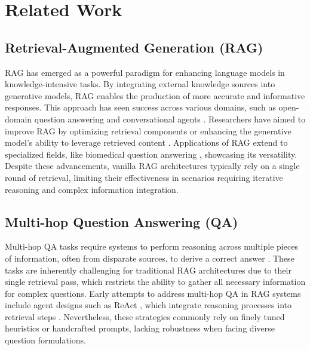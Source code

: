 \section{Related Work}

\subsection{Retrieval-Augmented Generation (RAG)}

RAG has emerged as a powerful paradigm for enhancing language models in knowledge-intensive tasks. By integrating external knowledge sources into generative models, RAG enables the production of more accurate and informative responses. This approach has seen success across various domains, such as open-domain question answering \citep{karpukhin2020dense} and conversational agents \citep{shuster2021retrieval}. Researchers have aimed to improve RAG by optimizing retrieval components \citep{zhang2023retrieve,nguyen2024reward,xu2024bmretriever} or enhancing the generative model’s ability to leverage retrieved content \citep{izacard2023atlas,zhang2024raft,fang2024enhancing,wei2024instructrag,jin2024rag,wang2024speculative,zhang2025rag}. Applications of RAG extend to specialized fields, like biomedical question answering \citep{xiong2024benchmarking,xu2024simrag,kim2024mdagents}, showcasing its versatility. Despite these advancements, vanilla RAG architectures typically rely on a single round of retrieval, limiting their effectiveness in scenarios requiring iterative reasoning and complex information integration.

\subsection{Multi-hop Question Answering (QA)}

Multi-hop QA tasks require systems to perform reasoning across multiple pieces of information, often from disparate sources, to derive a correct answer \citep{yang2018hotpotqa,ho2020constructing}. These tasks are inherently challenging for traditional RAG architectures due to their single retrieval pass, which restricts the ability to gather all necessary information for complex questions. Early attempts to address multi-hop QA in RAG systems include agent designs such as ReAct \citep{yao2023react}, which integrate reasoning processes into retrieval steps \citep{trivedi2023interleaving,asai2023self,jiang2023active,press2023measuring,ram2023context,wang2024rat,khot2022decomposed,shao2023enhancing,wang2023knowledge,shi2024generate,yu2024autorag}. Nevertheless, these strategies commonly rely on finely tuned heuristics or handcrafted prompts, lacking robustness when facing diverse question formulations.

